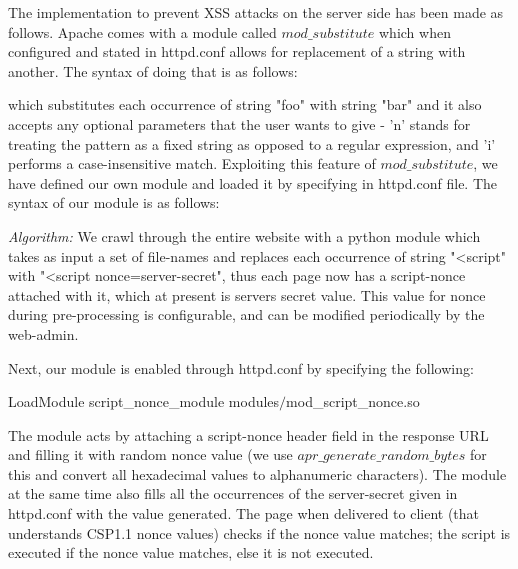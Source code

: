 \documentclass{article}
\begin{document}
The implementation to prevent XSS attacks on the server side has been made as follows. Apache comes with a module called $mod\_substitute$ which when configured and stated in httpd.conf allows for replacement of a string with another. The syntax of doing that is as follows:
\\
\begin{algorithmic}
\end{algorithmic}

which substitutes each occurrence of string "foo" with string "bar" and it also accepts any optional parameters that the user wants to give - 'n' stands for treating the pattern as a fixed string as opposed to a regular expression, and 'i' performs a case-insensitive match. Exploiting this feature of $mod\_substitute$, we have defined our own module and loaded it by specifying in httpd.conf file. The syntax of our module is as follows:
\\
\begin{algorithmic}
\end{algorithmic}
\medskip

\noindent
\textit{Algorithm: } We crawl through the entire website with a python module which takes as input a set of file-names and replaces each occurrence of string "\textless script" with "\textless script nonce=server-secret", thus each page now has a script-nonce attached with it, which at present is servers secret value. This value for nonce during pre-processing is configurable, and can be modified periodically by the web-admin.

\noindent
Next, our module is enabled through httpd.conf by specifying the following:

\noindent
\textsf{ LoadModule script\_nonce\_module modules$/$mod\_script\_nonce.so}

The module acts by attaching a script-nonce header field in the response URL and filling it with random nonce value (we use $apr\_generate\_random\_bytes$ for this and convert all hexadecimal values to alphanumeric characters). The module at the same time also fills all the occurrences of the server-secret given in httpd.conf with the value generated. The page when delivered to client (that understands CSP1.1 nonce values) checks if the nonce value matches; the script is executed if the nonce value matches, else it is not executed.
\end{document}
